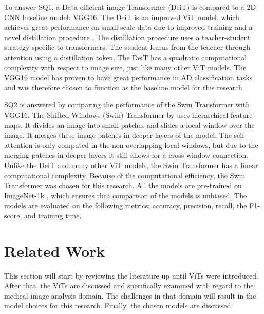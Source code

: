 \documentclass[11pt, a4paper]{article}
\begin{document}
\noindent To answer SQ1, a Data-efficient image Transformer (DeiT) is compared to a 2D CNN baseline model: VGG16. The DeiT is an improved ViT model, which achieves great performance on small-scale data due to improved training and a novel distillation procedure \citep{Touvron2021TrainingAttention}. The distillation procedure uses a  teacher-student strategy specific to transformers. The student learns from the teacher through attention using a distillation token.
The DeiT has a quadratic computational complexity with respect to image size, just like many other ViT models. The VGG16 model has proven to have great performance in AD classification tasks and was therefore chosen to function as the baseline model for this research \citep{Billones2017DemNet:Impairment,Hon2017TowardsLearning,Jain2019ConvolutionalImages}.

SQ2 is answered by comparing the performance of the Swin Transformer with VGG16. The Shifted Windows (Swin) Transformer by \cite{Liu2021SwinWindows} uses hierarchical feature maps. It divides an image into small patches and slides a local window over the image. It merges these image patches in deeper layers of the model. The self-attention is only computed in the non-overlapping local windows, but due to the merging patches in deeper layers it still allows for a cross-window connection. Unlike the DeiT and many other ViT models, the Swin Transformer has a linear computational complexity. Because of the computational efficiency, the Swin Transformer was chosen for this research. All the models are pre-trained on ImageNet-1k \citep{Deng2009ImageNet:Database}, which ensures that comparison of the models is unbiased. The models are evaluated on the following metrics: accuracy, precision, recall, the F1-score, and training time.

\newpage

\section{Related Work}
This section will start by reviewing the literature up until ViTs were introduced. After that, the ViTs are discussed and specifically examined with regard to the medical image analysis domain. The challenges in that domain will result in the model choices for this research. Finally, the chosen models are discussed.
\end{document}
